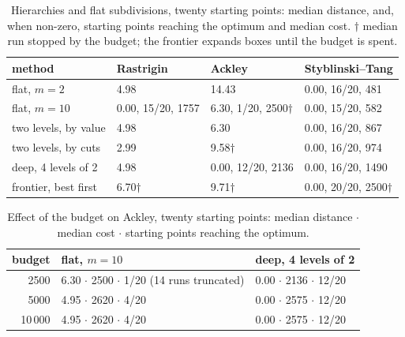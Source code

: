 \documentclass[pdflatex,sn-basic]{sn-jnl}
\newenvironment{appendices}{\appendix}{}
\begin{document}
\begin{appendices}
\begin{table}[h]
  \centering
  \caption{Hierarchies and flat subdivisions, twenty starting points: median
    distance, and, when non-zero, starting points reaching the optimum and median
    cost. $\dagger$ median run stopped by the budget; the frontier expands boxes
    until the budget is spent.}
  \label{tab:hierarchies}
  \small
  \begin{tabular}{llll}
    \toprule
    method & Rastrigin & Ackley & Styblinski--Tang \\
    \midrule
    flat, $m=2$               & 4.98                & 14.43                   & 0.00, 16/20, 481 \\
    flat, $m=10$              & 0.00, 15/20, 1757   & 6.30, 1/20, 2500$\dagger$ & 0.00, 15/20, 582 \\
    two levels, by value      & 4.98                & 6.30                    & 0.00, 16/20, 867 \\
    two levels, by cuts       & 2.99                & 9.58$\dagger$           & 0.00, 16/20, 974 \\
    deep, 4 levels of 2       & 4.98                & 0.00, 12/20, 2136       & 0.00, 16/20, 1490 \\
    frontier, best first      & 6.70$\dagger$       & 9.71$\dagger$           & 0.00, 20/20, 2500$\dagger$ \\
    \bottomrule
  \end{tabular}
\end{table}

\begin{table}[h]
  \centering
  \caption{Effect of the budget on Ackley, twenty starting points: median distance
    $\cdot$ median cost $\cdot$ starting points reaching the optimum.}
  \label{tab:budget}
  \small
  \begin{tabular}{rll}
    \toprule
    budget & flat, $m=10$ & deep, 4 levels of 2 \\
    \midrule
    2500     & 6.30 $\cdot$ 2500 $\cdot$ 1/20 (14 runs truncated) & 0.00 $\cdot$ 2136 $\cdot$ 12/20 \\
    5000     & 4.95 $\cdot$ 2620 $\cdot$ 4/20                     & 0.00 $\cdot$ 2575 $\cdot$ 12/20 \\
    10\,000  & 4.95 $\cdot$ 2620 $\cdot$ 4/20                     & 0.00 $\cdot$ 2575 $\cdot$ 12/20 \\
    \bottomrule
  \end{tabular}
\end{table}


\end{appendices}
\end{document}
